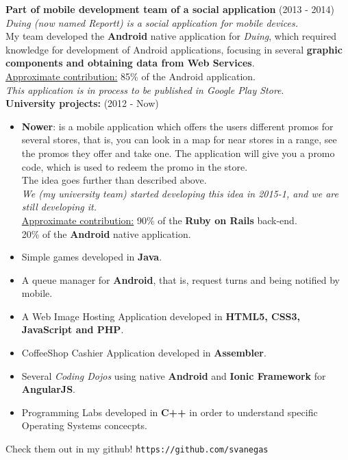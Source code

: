 \documentclass[margin, 10pt]{res} %
\begin{document}
\begin{resume}
\textbf{Part of mobile development team of a social application} \hfill (2013 - 2014)\\
\textit{{\sl Duing} (now named {\sl Reportt}) is a social application for mobile devices.}\\
My team developed the \textbf{Android} native application for {\sl Duing}, which required knowledge
for development of Android applications, focusing in several \textbf{graphic components and
obtaining data from Web Services}.\\
\underline{Approximate contribution:} 85\% of the Android application. \\
\emph{This application is in process to be published in Google Play Store}.\\
\textbf{University projects:} \hfill (2012 - Now)
\begin{itemize}
  \item \textbf{Nower}: is a mobile application which offers the users different promos for several stores,
          that is, you can look in a map for near stores in a range, see the promos they offer and take one.
          The application will give you a promo code, which is used to redeem the promo in the store.\\
          The idea goes further than described above.\\
          \emph{We (my university team) started developing this idea in 2015-1, and we are still developing it.}\\
          \underline{Approximate contribution:} 90\% of the \textbf{Ruby on Rails} back-end.\\
                                                                  20\% of the \textbf{Android} native application.
  \item Simple games developed in \textbf{Java}.
  \item A queue manager for \textbf{Android}, that is, request turns and being notified by mobile.
  \item A Web Image Hosting Application developed in \textbf{HTML5, CSS3, JavaScript and PHP}.
  \item CoffeeShop Cashier Application developed in \textbf{Assembler}.
  \item Several \textit{Coding Dojos} using native \textbf{Android} and \textbf{Ionic Framework} for
        \textbf{AngularJS}.
  \item Programming Labs developed in \textbf{C++} in order to understand specific Operating Systems
        concecpts.
\end{itemize}
Check them out in my github! \texttt{https://github.com/svanegas}


\end{resume}
\end{document}
